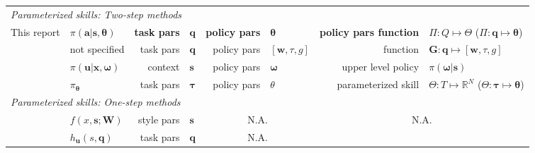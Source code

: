 \documentclass[12pt]{article}
\newcommand{\mymath}[1]{\ensuremath{#1}\xspace}
\newcommand{\pol}    {\mymath{\pi}}
\newcommand{\act}    {\mymath{\mathbf{a}}}
\newcommand{\sta}    {\mymath{\mathbf{s}}}
\newcommand{\app}    {\mymath{\bm{\theta}}}
\newcommand{\appsp}  {\mymath{\Theta}}
\newcommand{\polg}   {\mymath{\Pi}}
\newcommand{\taskp}  {\mymath{\mathbf{q}}}
\newcommand{\taskpsp}{\mymath{Q}}
\begin{document}
\begin{table}[ht]
  \centering
\begin{scriptsize}
\begin{tabular}{|l|l|rl|rl|rl|}
\hline
\multicolumn{8}{|l|}{\em Parameterized skills: Two-step methods}\\
This report                          
& $\pol(\act|\sta,\app)$ 
& {\bf task pars}            & \taskp 
& {\bf policy pars}          & \app 
& {\bf policy pars function} & $\polg: \taskpsp \mapsto \appsp$ ($\polg: \taskp \mapsto \app$)\\  
\citet{ude10taskspecific}      
& not specified
& task pars            & $\mathbf{q}$ 
& policy pars          & $[\mathbf{w},\tau,g]$ 
& function             & $\mathbf{G}: \mathbf{q} \mapsto [\mathbf{w},\tau,g]$ \\  
\citet{kupcsik13dataefficient} 
& $\pi(\mathbf{u}|\mathbf{x},\mathbf{\omega})$ 
& context              & $\mathbf{s}$
& policy pars          & $\mathbf{\omega}$ 
& upper level policy   & $\pi(\mathbf{\omega}|\mathbf{s})$ \\  
\citet{silva12learning}        
& $\pi_\mathbf{\theta}$
& task pars            & $\mathbf{\tau}$ 
& policy pars          & ${\theta}$
& parameterized skill  & $\Theta: T \mapsto \mathbb{R}^N$ ($\Theta: \mathbf{\tau} \mapsto \mathbf{\theta}$)\\
\hline
\multicolumn{8}{|l|}{\em Parameterized skills: One-step methods}\\
\citet{matsubara11learning}    
& $f(x,\mathbf{s}; \mathbf{W})$
& style pars           & $\mathbf{s}$ 
& \multicolumn{2}{c|}{N.A.}   
& \multicolumn{2}{c|}{N.A.} \\  
\citet{stulp13learning}        
& $h_\mathbf{u}(s,\mathbf{q})$
& task pars            & $\mathbf{q}$ 
& \multicolumn{2}{c|}{N.A.}   

\end{tabular}
\end{scriptsize}
\end{table}
\end{document}
